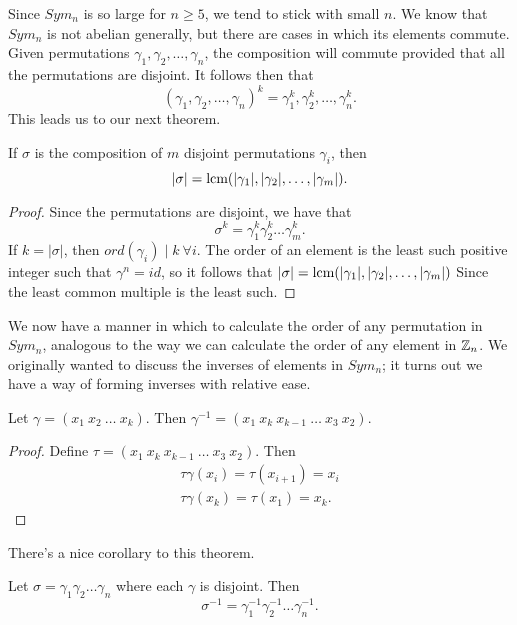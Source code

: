 Since $Sym_{n}$ is so large for $n\geq5$, we tend to stick with small $n$. We know that $Sym_{n}$ is not abelian generally, but there are cases in which its elements commute. Given permutations $\gamma_{1},\gamma_{2},\dots,\gamma_{n}$, the composition will commute provided that all the permutations are disjoint.
It follows then that
\[
    (\gamma_{1},\gamma_{2},\dots,\gamma_{n})^{k}=\gamma_{1}^{k},\gamma_{2}^{k},\dots,\gamma_{n}^{k}.
\]
This leads us to our next theorem.
\begin{theorem}{}
    If $\sigma$ is the composition of $m$ disjoint permutations $\gamma_{i}$, then
    \[
        |\sigma|= \text{lcm}(|\gamma_{1}|,|\gamma_{2}|,\dots,|\gamma_{m}|).
    \]
\end{theorem}
\begin{proof}
    Since the permutations are disjoint, we have that
    \[
        \sigma^{k}=\gamma_{1}^{k}\gamma_{2}^{k}\dots\gamma_{m}^{k}.
    \]
    If $k=|\sigma|$, then $ord(\gamma_{i})\mid k\ \forall i$. The order of an element is the least such positive integer such that $\gamma^{n}=id$, so it follows that $|\sigma|=\text{lcm}(|\gamma_{1}|,|\gamma_{2}|,\dots,|\gamma_{m}|)$ Since the least common multiple is the least such.
\end{proof}
We now have a manner in which to calculate the order of any permutation in $Sym_{n}$, analogous to the way we can calculate the order of any element in $\mathbb{Z}_{n}$. We originally wanted to discuss the inverses of elements in $Sym_{n}$; it turns out we have a way of forming inverses with relative ease.
\begin{theorem}{}
    Let $\gamma=(x_{1}\ x_{2}\ \dots\ x_{k})$. Then $\gamma^{-1}=(x_{1}\ x_{k}\ x_{k-1}\ \dots\ x_{3}\ x_{2})$.
\end{theorem}
\begin{proof}
    Define $\tau=(x_{1}\ x_{k}\ x_{k-1}\ \dots\ x_{3}\ x_{2})$. Then
    \begin{gather*}
        \tau\gamma(x_{i})=\tau(x_{i+1})=x_{i}\\
        \tau\gamma(x_{k})=\tau(x_{1})=x_{k}.
    \end{gather*}
\end{proof}
There's a nice corollary to this theorem.
\begin{corollary}
    Let $\sigma=\gamma_{1}\gamma_{2}\dots\gamma_{n}$ where each $\gamma$ is disjoint. Then
    \[
        \sigma^{-1}=\gamma_{1}^{-1}\gamma_{2}^{-1}\dots\gamma_{n}^{-1}.
    \]
\end{corollary}

